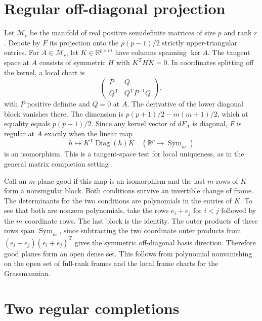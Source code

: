 \documentclass[11pt,a4paper]{amsart}
\newcommand{\R}{\mathbb R}
\newcommand{\Diag}{\operatorname{Diag}}
\newcommand{\Sym}{\operatorname{Sym}}
\begin{document}
\section{Regular off-diagonal projection}

Let $\mathcal{M}_r$ be the manifold of real positive semidefinite matrices of size $p$ and rank $r$. Denote by $F$ its projection onto the $p(p-1)/2$ strictly upper-triangular entries. For $A\in\mathcal{M}_r$, let $K\in\R^{p\times m}$ have columns spanning $\ker A$. The tangent space at $A$ consists of symmetric $H$ with $K^{\mathrm T}HK=0$. In coordinates splitting off the kernel, a local chart is
\[
 \begin{pmatrix}P&Q\\Q^{\mathrm T}&Q^{\mathrm T}P^{-1}Q\end{pmatrix},
\]
with $P$ positive definite and $Q=0$ at $A$. The derivative of the lower diagonal block vanishes there. The dimension is $p(p+1)/2-m(m+1)/2$, which at equality equals $p(p-1)/2$. Since any kernel vector of $dF_A$ is diagonal, $F$ is regular at $A$ exactly when the linear map
\[
             h\longmapsto K^{\mathrm T}\Diag(h)K
             \quad(\R^p\longrightarrow\Sym_m)
\]
is an isomorphism. This is a tangent-space test for local uniqueness, as in the general matrix completion setting \cite[Theorem III.2]{shapirocompletion}.

Call an $m$-plane good if this map is an isomorphism and the last $m$ rows of $K$ form a nonsingular block. Both conditions survive an invertible change of frame. The determinants for the two conditions are polynomials in the entries of $K$. To see that both are nonzero polynomials, take the rows $e_i+e_j$ for $i<j$ followed by the $m$ coordinate rows. The last block is the identity. The outer products of these rows span $\Sym_m$, since subtracting the two coordinate outer products from $(e_i+e_j)(e_i+e_j)^{\mathrm T}$ gives the symmetric off-diagonal basis direction. Therefore good planes form an open dense set. This follows from polynomial nonvanishing on the open set of full-rank frames and the local frame charts for the Grassmannian.

\section{Two regular completions}
\end{document}
